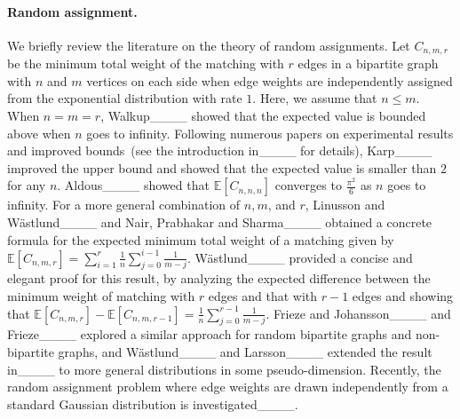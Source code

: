 \paragraph{Random assignment.}
We briefly review the literature on the theory of random assignments. 
Let $C_{n,m,r}$ be the minimum total weight of the matching with $r$ edges in a bipartite graph with $n$ and $m$ vertices on each side when edge weights are independently assigned from the exponential distribution with rate $1$. Here, we assume that $n\leq m$. 
When $n=m=r$, Walkup____ showed that the expected value is bounded above when $n$ goes to infinity. 
Following numerous papers on experimental results and improved bounds~(see the introduction in____ for details), Karp____ improved the upper bound and showed that the expected value is smaller than $2$ for any $n$. Aldous____ showed that $\mathbb{E}[C_{n,n,n}]$ converges to $\frac{\pi^2}{6}$ as $n$ goes to infinity. 
For a more general combination of $n,m$, and $r$, Linusson and W\"{a}stlund____ and Nair, Prabhakar and Sharma____
obtained a concrete formula for the expected minimum total weight of a matching
given by $\mathbb{E}[C_{n,m,r}]  = \sum_{i=1}^r \frac{1}{n} \sum_{j=0}^{i-1} \frac{1}{m-j}$.
W\"{a}stlund____ provided a concise and elegant proof for this result, by analyzing the expected difference between the minimum weight of matching with $r$ edges and that with $r-1$ edges and showing that $\mathbb{E}[C_{n,m,r}] - \mathbb{E}[C_{n,m,r-1}] = \frac{1}{n}\sum_{j=0}^{r-1}\frac{1}{m-j}$.
Frieze and Johansson____ and Frieze____ explored a similar approach for random bipartite graphs and non-bipartite graphs, and W\"{a}stlund____ and Larsson____ extended the result in____ to more general distributions in some pseudo-dimension.
Recently, the random assignment problem where edge weights are drawn independently from a standard Gaussian distribution is investigated____.


